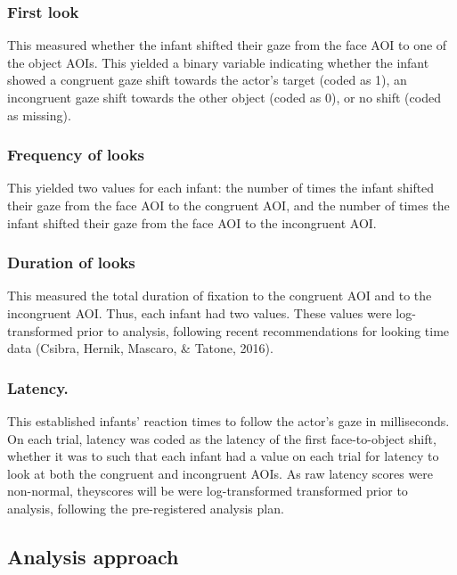 \documentclass[,man,floatsintext]{apa6}
\begin{document}
\hypertarget{first-look}{%
\subsubsection{First look}\label{first-look}}

This measured whether the infant shifted their gaze from the face AOI to one of the object AOIs. This yielded a binary variable indicating whether the infant showed a congruent gaze shift towards the actor's target (coded as 1), an incongruent gaze shift towards the other object (coded as 0), or no shift (coded as missing).

\hypertarget{frequency-of-looks}{%
\subsubsection{Frequency of looks}\label{frequency-of-looks}}

This yielded two values for each infant: the number of times the infant shifted their gaze from the face AOI to the congruent AOI, and the number of times the infant shifted their gaze from the face AOI to the incongruent AOI.

\hypertarget{duration-of-looks}{%
\subsubsection{Duration of looks}\label{duration-of-looks}}

This measured the total duration of fixation to the congruent AOI and to the incongruent AOI. Thus, each infant had two values. These values were log-transformed prior to analysis, following recent recommendations for looking time data (Csibra, Hernik, Mascaro, \& Tatone, 2016).

\hypertarget{latency.}{%
\subsubsection{Latency.}\label{latency.}}

This established infants' reaction times to follow the actor's gaze in milliseconds. On each trial, latency was coded as the latency of the first face-to-object shift, whether it was to such that each infant had a value on each trial for latency to look at both the congruent and incongruent AOIs. As raw latency scores were non-normal, theyscores will be were log-transformed transformed prior to analysis, following the pre-registered analysis plan.

\hypertarget{analysis-approach}{%
\subsection{Analysis approach}\label{analysis-approach}}
\end{document}
